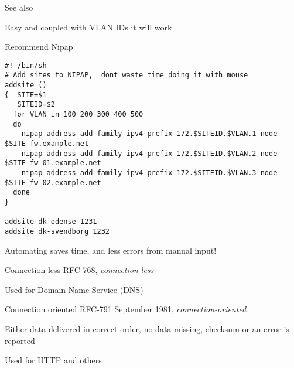 \documentclass[Screen16to9,17pt]{foils}
\begin{document}
See also 




\centerline{Easy and coupled with VLAN IDs it will work \smiley}




\begin{list2}
\item Recommend Nipap 
\end{list2}





\begin{verbatim}
#! /bin/sh
# Add sites to NIPAP,  dont waste time doing it with mouse
addsite ()
{  SITE=$1
   SITEID=$2
  for VLAN in 100 200 300 400 500
  do
    nipap address add family ipv4 prefix 172.$SITEID.$VLAN.1 node $SITE-fw.example.net
    nipap address add family ipv4 prefix 172.$SITEID.$VLAN.2 node $SITE-fw-01.example.net
    nipap address add family ipv4 prefix 172.$SITEID.$VLAN.3 node $SITE-fw-02.example.net
  done
}

addsite dk-odense 1231
addsite dk-svendborg 1232
\end{verbatim}

\begin{list2}
  \item Automating saves time, and less errors from manual input!
\end{list2}

\begin{list1}
\item Connection-less RFC-768, \emph{connection-less}
\item Used for Domain Name Service (DNS)
\end{list1}


\begin{list1}
\item Connection oriented RFC-791 September 1981, \emph{connection-oriented}
\item Either data delivered in correct order, no data missing, checksum or an error is reported
\item Used for HTTP and others
\end{list1}
\end{document}

